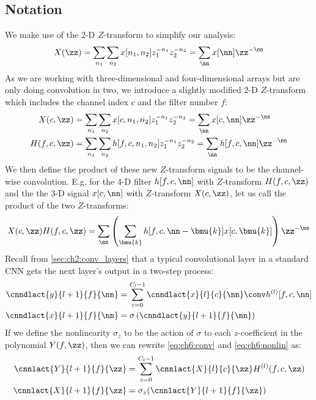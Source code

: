 \subsection{Notation}
We make use of the 2-D $Z$-transform to simplify our analysis:
%
\begin{equation}
  X(\zz) = \sum_{n_1}\sum_{n_2} x[n_1, n_2]z_1^{-n_1}z_2^{-n_2} =
  \sum_{\nn}x[\nn]\zz^{-\nn}
\end{equation}
%
As we are working with three-dimensional and four-dimensional arrays but are
only doing convolution in two, we introduce a slightly modified 2-D $Z$-transform
which includes the channel index $c$ and the filter number $f$:
\begin{align}
  X(c, \zz) & = \sum_{n_1}\sum_{n_2} x[c, n_1, n_2]z_1^{-n_1}z_2^{-n_2} =
    \sum_{\nn}x[c, \nn]\zz^{-\nn} \label{eq:ch6:ztransform} \\
  H(f, c, \zz) & = \sum_{n_1}\sum_{n_2} h[f, c, n_1, n_2]z_1^{-n_1}z_2^{-n_2} =
    \sum_{\nn}h[f, c, \nn]\zz^{-\nn} \label{eq:ch6:ztransform2}
\end{align}
We then define the product of these new $Z$-transform signals to be the
channel-wise convolution. E.g. for the 4-D filter $h[f, c, \nn]$ with $Z$-transform
$H(f, c, \zz)$ and the the 3-D signal $x[c, \nn]$ with $Z$-transform $X(c, \zz)$,
let us call the product of the two $Z$-transforms:
\begin{equation}
  X(c, \zz)H(f, c, \zz) = \sum_{\nn}\left(\sum_{\bmu{k}}h[f, c, \nn-\bmu{k}]x[c, \bmu{k}]\right)\zz^{-\nn} \label{eq:ch6:zproduct}
\end{equation}
%
Recall from \autoref{sec:ch2:conv_layers} that a typical convolutional
layer in a standard CNN gets the next layer's output in a two-step process:
%
\begin{align} 
  \cnndlact{y}{l+1}{f}{\nn} &= \sum_{c=0}^{C_l - 1} \cnndlact{x}{l}{c}{\nn} \conv h^{(l)}[f, c, \nn]
    \label{eq:ch6:conv}\\
    \cnndlact{x}{l+1}{f}{\nn} & =  \sigma \left( \cnndlact{y}{l+1}{f}{\nn} \right) \label{eq:ch6:nonlin}
\end{align}
%
If we define the nonlinearity $\sigma_z$ to be the action of $\sigma$ to each
$z$-coefficient in the polynomial $Y(f, \zz)$, then we can rewrite
\eqref{eq:ch6:conv} and \eqref{eq:ch6:nonlin} as:
%
\begin{align}
  \cnnlact{Y}{l+1}{f}{\zz} &= \sum_{c=0}^{C_l - 1} \cnnlact{X}{l}{c}{\zz} H^{(l)}(f, c, \zz) \\
  \cnnlact{X}{l+1}{f}{\zz} &= \sigma_z(\cnnlact{Y}{l+1}{f}{\zz})
\end{align}
%
